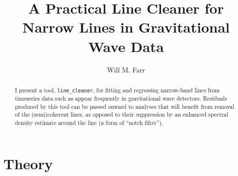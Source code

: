 \documentclass[modern]{aastex631}
\begin{document}
\title{A Practical Line Cleaner for Narrow Lines in Gravitational Wave Data}

\author[0000-0003-1540-8562]{Will M. Farr}

\begin{abstract}
    I present a tool, \texttt{line\_cleaner}, for fitting and regressing
    narrow-band lines from timeseries data such as appear frequently in
    gravitational wave detectors.  Residuals produced by this tool can be passed
    onward to analyses that will benefit from removal of the (semi)coherent
    lines, as opposed to their suppression by an enhanced spectral density
    estimate around the line (a form of ``notch filter'').
\end{abstract}

\section{Theory}
\label{sec:theory}
\end{document}
